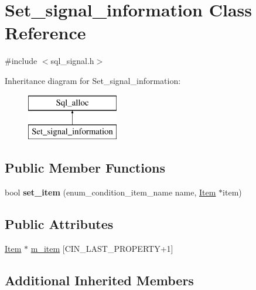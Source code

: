 \hypertarget{classSet__signal__information}{}\section{Set\+\_\+signal\+\_\+information Class Reference}
\label{classSet__signal__information}


{\ttfamily \#include $<$sql\+\_\+signal.\+h$>$}

Inheritance diagram for Set\+\_\+signal\+\_\+information\+:\begin{figure}[H]
\begin{center}
\leavevmode
\includegraphics[height=2.000000cm]{classSet__signal__information}
\end{center}
\end{figure}
\subsection*{Public Member Functions}
\begin{DoxyCompactItemize}
\item 
\mbox{\label{classSet__signal__information_a71c3462b33f4a8593a7a39a9091e1db9}} 
bool {\bfseries set\+\_\+item} (enum\+\_\+condition\+\_\+item\+\_\+name name, \mbox{\hyperlink{classItem}{Item}} $\ast$item)
\end{DoxyCompactItemize}
\subsection*{Public Attributes}
\begin{DoxyCompactItemize}
\item 
\mbox{\hyperlink{classItem}{Item}} $\ast$ \mbox{\hyperlink{classSet__signal__information_a524ccdde56b465f50940abd11dbebcbf}{m\+\_\+item}} \mbox{[}C\+I\+N\+\_\+\+L\+A\+S\+T\+\_\+\+P\+R\+O\+P\+E\+R\+TY+1\mbox{]}
\end{DoxyCompactItemize}
\subsection*{Additional Inherited Members}


